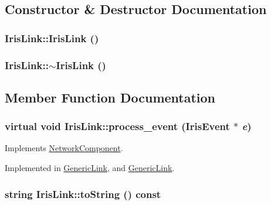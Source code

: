 \subsection{Constructor \& Destructor Documentation}
\hypertarget{classIrisLink_338c9fe1f9c8424e885d8e48d43ca2e3}{
\subsubsection[{IrisLink}]{\setlength{\rightskip}{0pt plus 5cm}IrisLink::IrisLink ()}}
\label{classIrisLink_338c9fe1f9c8424e885d8e48d43ca2e3}


\hypertarget{classIrisLink_2d3be414256bdfab31989b0f3c437da2}{
\subsubsection[{$\sim$IrisLink}]{\setlength{\rightskip}{0pt plus 5cm}IrisLink::$\sim$IrisLink ()}}
\label{classIrisLink_2d3be414256bdfab31989b0f3c437da2}




\subsection{Member Function Documentation}
\hypertarget{classIrisLink_9c5494bc5716aedf3affe748f3a542c1}{
\subsubsection[{process\_\-event}]{\setlength{\rightskip}{0pt plus 5cm}virtual void IrisLink::process\_\-event ({\bf IrisEvent} $\ast$ {\em e})}}
\label{classIrisLink_9c5494bc5716aedf3affe748f3a542c1}




Implements \hyperlink{classNetworkComponent_c93793eea1e2d424abe86e110ca8b399}{NetworkComponent}.

Implemented in \hyperlink{classGenericLink_c09533f8445eb3c550c744fd4ada7324}{GenericLink}, and \hyperlink{classGenericLink_c09533f8445eb3c550c744fd4ada7324}{GenericLink}.\hypertarget{classIrisLink_d25db1c98385d7abd82180e5746813a6}{
\subsubsection[{toString}]{\setlength{\rightskip}{0pt plus 5cm}string IrisLink::toString () const}}
\label{classIrisLink_d25db1c98385d7abd82180e5746813a6}




